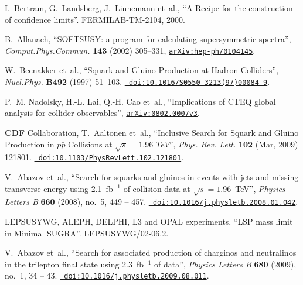 \begin{thebibliography}{10}
I.~Bertram, G.~Landsberg, J.~Linnemann{ et~al.}, ``A Recipe for the
  construction of confidence limits''. FERMILAB-TM-2104, 2000.

B.~Allanach, ``SOFTSUSY: a program for calculating supersymmetric spectra'',
  {\em Comput.Phys.Commun.} {\bf 143} (2002) 305--331,
  \href{http://www.arXiv.org/abs/hep-ph/0104145}{{\tt arXiv:hep-ph/0104145}}.

W.~Beenakker {et~al.}, ``Squark and Gluino Production at Hadron Colliders'',
  {\em Nucl.Phys.} {\bf B492} (1997) 51--103.
  \href{http://dx.doi.org/10.1016/S0550-3213(97)00084-9}{{\tt
  doi:10.1016/S0550-3213(97)00084-9}}.

P.~M. Nadolsky, H.-L. Lai, Q.-H. Cao{ et~al.}, ``Implications of CTEQ global
  analysis for collider observables'',
  \href{http://www.arXiv.org/abs/0802.0007v3}{{\tt arXiv:0802.0007v3}}.

{\bf CDF} Collaboration, T.~Aaltonen {et~al.}, ``Inclusive Search for Squark
  and Gluino Production in {$p\bar{p}$} Collisions at $\sqrt{s}=1.96\,\,TeV$'',
  {\em Phys. Rev. Lett.} {\bf 102} (Mar, 2009) 121801.
  \href{http://dx.doi.org/10.1103/PhysRevLett.102.121801}{{\tt
  doi:10.1103/PhysRevLett.102.121801}}.

V.~Abazov {et~al.}, ``Search for squarks and gluinos in events with jets and
  missing transverse energy using 2.1~fb{${}^{-1}$} of collision data at
  {$\sqrt{s}=1.96$}~TeV'', {\em Physics Letters B} {\bf 660} (2008), no.~5, 449
  -- 457. \href{http://dx.doi.org/10.1016/j.physletb.2008.01.042}{{\tt
  doi:10.1016/j.physletb.2008.01.042}}.

{LEPSUSYWG, ALEPH, DELPHI, L3 and OPAL experiments}, ``LSP mass limit in
  Minimal SUGRA''. LEPSUSYWG/02-06.2.

V.~Abazov {et~al.}, ``Search for associated production of charginos and
  neutralinos in the trilepton final state using 2.3~fb{${}^{-1}$} of data'',
  {\em Physics Letters B} {\bf 680} (2009), no.~1, 34 -- 43.
  \href{http://dx.doi.org/10.1016/j.physletb.2009.08.011}{{\tt
  doi:10.1016/j.physletb.2009.08.011}}.

\end{thebibliography}\endgroup
